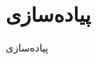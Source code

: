 \documentclass[oneside,a4paper,11pt]{report}
\begin{document}
\patchcmd{\chapter}{\thispagestyle{plain}}{\thispagestyle{fancy}}{}{}


\pagestyle{fancy}

\lhead{}
\rhead{\leftmark}
\newpage
%




\section*{پیاده‌سازی}
پیاده‌سازی


\end{document}
